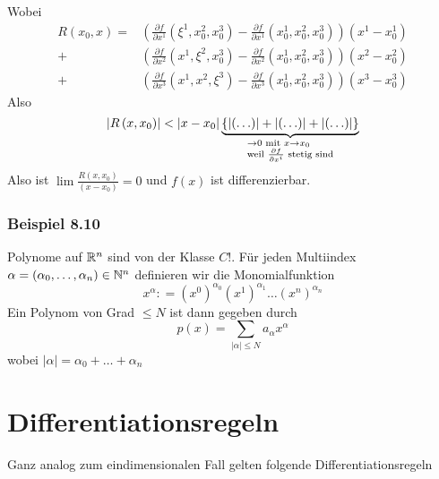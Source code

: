 Wobei
\begin{align*}
R\left( {{x_0},x} \right) = &\left( {\frac{{\partial f}}{{\partial {x^1}}}\left( {{\xi ^1},x_0^2,x_0^3} \right) - \frac{{\partial f}}{{\partial {x^1}}}\left( {x_0^1,x_0^2,x_0^3} \right)} \right)\left( {{x^1} - x_0^1} \right)\\
 + &\left( {\frac{{\partial f}}{{\partial {x^2}}}\left( {{x^1},{\xi ^2},x_0^3} \right) - \frac{{\partial f}}{{\partial {x^2}}}\left( {x_0^1,x_0^2,x_0^3} \right)} \right)\left( {{x^2} - x_0^2} \right)\\
 + &\left( {\frac{{\partial f}}{{\partial {x^3}}}\left( {{x^1},{x^2},{\xi ^3}} \right) - \frac{{\partial f}}{{\partial {x^3}}}\left( {x_0^1,x_0^2,x_0^3} \right)} \right)\left( {{x^3} - x_0^3} \right)
\end{align*}
Also
\[\left| {R\left( {x,{x_0}} \right)} \right| < \left| {x - {x_0}} \right|\underbrace {\left\{ {\left| {\left(  \ldots  \right)} \right| + \left| {\left(  \ldots  \right)} \right| + \left| {\left(  \ldots  \right)} \right|} \right\}}_{\scriptstyle \to 0{\text{ mit }}x \to {x_0}\hfill\atop
\scriptstyle{\text{weil }}\frac{{\partial f}}{{\partial {x^i}}}{\text{ stetig sind}}\hfill}\]
Also ist $\lim\frac{R\left( x,x_0\right)}{\left( x-x_0\right)}=0$ und $f(x)$ ist differenzierbar.

\subsubsection*{Beispiel 8.10}
Polynome auf $\mathbb{R}^n$ sind von der Klasse $C!$. Für jeden Multiindex $\alpha=\left(\alpha_0,\dots , \alpha_n\right)\in\mathbb{N}^n$ definieren wir die Monomialfunktion \[{x^\alpha }: = {\left( {{x^0}} \right)^{{\alpha _0}}}{\left( {{x^1}} \right)^{{\alpha _1}}} \ldots {\left( {{x^n}} \right)^{{\alpha _n}}}\] Ein Polynom von Grad $\leq N$ ist dann gegeben durch \[p(x) = \sum\limits_{\left| \alpha  \right| \le N} {{a_\alpha }{x^\alpha }} \] wobei $\left| \alpha  \right| = {\alpha _0} +  \ldots  + {\alpha _n}$
\section{Differentiationsregeln}
Ganz analog zum eindimensionalen Fall gelten folgende Differentiationsregeln

